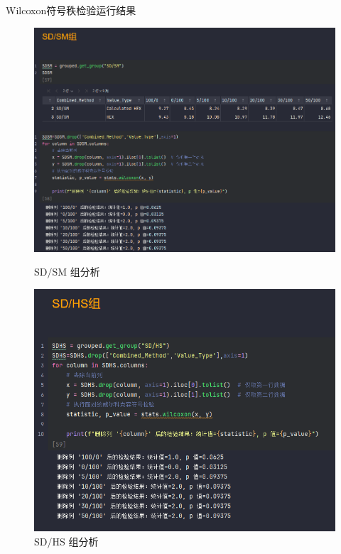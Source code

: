 \documentclass{beamer}
\begin{document}
\begin{frame}{Wilcoxon符号秩检验运行结果}
    \justifying
        \vspace{0.3cm}
        \begin{figure}[htbp]
        \centering
        \begin{minipage}{0.4\linewidth}
            \centering
            \includegraphics[width=\linewidth]{pic/path_to_image3.png} %
            \caption{SD/SM 组分析}
        \end{minipage}
        \hspace{0.5cm}
        \begin{minipage}{0.4\linewidth}
            \centering
            \includegraphics[width=\linewidth]{pic/path_to_image4.png} %
            \caption{SD/HS 组分析}
        \end{minipage}
    \end{figure}
\end{frame}
\end{document}

